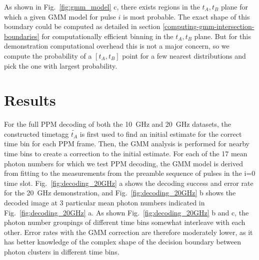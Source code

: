 \documentclass[11pt]{caltech_thesis} %
\begin{document}
As shown in Fig.~\ref{fig:gmm_model} c, there exists regions in the $t_A, t_B$ plane for which a given GMM model for pulse $i$ is most probable. The exact shape of this boundary could be computed as detailed in section \ref{computing-gmm-intersection-boundaries} for computationally efficient binning in the $t_A, t_B$ plane. But for this demonstration computational overhead this is not a major concern, so we compute the probability of a $[t_A, t_B]$ point for a few nearest distributions and pick the one with largest probability.

\hypertarget{results-1}{%
\section{Results}\label{results-1}}

For the full PPM decoding of both the 10~GHz and 20~GHz datasets, the constructed timetagg $\tilde{t_A}$ is first used to find an initial estimate for the correct time bin for each PPM frame. Then, the GMM analysis is performed for nearby time bins to create a correction to the initial estimate. For each of the 17 mean photon numbers for which we test PPM decoding, the GMM model is derived from fitting to the measurements from the preamble sequence of pulses in the i=0 time slot. Fig.~\ref{fig:decoding_20GHz} a shows the decoding success and error rate for the 20~GHz demonstration, and
Fig.~\ref{fig:decoding_20GHz} b shows the decoded image at 3 particular mean photon numbers indicated in Fig.~\ref{fig:decoding_20GHz} a. As shown Fig.~\ref{fig:decoding_20GHz} b and c, the photon number groupings of different time bins somewhat interleave with each other. Error rates with the GMM correction are therefore moderately lower, as it has better knowledge of the complex shape of the decision boundary between photon clusters in different time bins.
\end{document}
